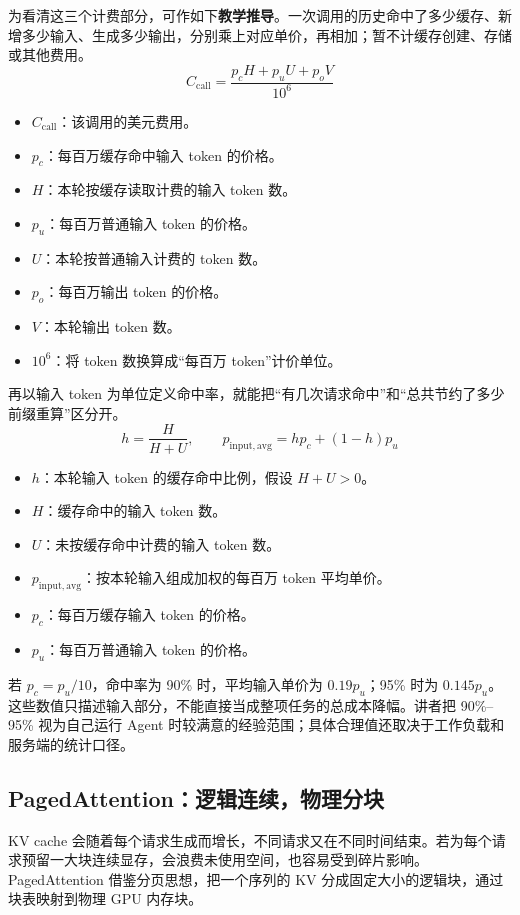 \documentclass[11pt,a4paper]{article}
\begin{document}
为看清这三个计费部分，可作如下\textbf{教学推导}。一次调用的历史命中了多少缓存、新增多少输入、生成多少输出，分别乘上对应单价，再相加；暂不计缓存创建、存储或其他费用。
$$
C_{\mathrm{call}}=\frac{p_c H+p_u U+p_o V}{10^6}
$$
\begin{itemize}
\item $C_{\mathrm{call}}$：该调用的美元费用。
\item $p_c$：每百万缓存命中输入 token 的价格。
\item $H$：本轮按缓存读取计费的输入 token 数。
\item $p_u$：每百万普通输入 token 的价格。
\item $U$：本轮按普通输入计费的 token 数。
\item $p_o$：每百万输出 token 的价格。
\item $V$：本轮输出 token 数。
\item $10^6$：将 token 数换算成“每百万 token”计价单位。
\end{itemize}

再以输入 token 为单位定义命中率，就能把“有几次请求命中”和“总共节约了多少前缀重算”区分开。
$$
h=\frac{H}{H+U},\qquad
p_{\mathrm{input,avg}}=h p_c+(1-h)p_u
$$
\begin{itemize}
\item $h$：本轮输入 token 的缓存命中比例，假设 $H+U>0$。
\item $H$：缓存命中的输入 token 数。
\item $U$：未按缓存命中计费的输入 token 数。
\item $p_{\mathrm{input,avg}}$：按本轮输入组成加权的每百万 token 平均单价。
\item $p_c$：每百万缓存输入 token 的价格。
\item $p_u$：每百万普通输入 token 的价格。
\end{itemize}

若 $p_c=p_u/10$，命中率为 90\% 时，平均输入单价为 $0.19p_u$；95\% 时为 $0.145p_u$。这些数值只描述输入部分，不能直接当成整项任务的总成本降幅。讲者把 90\%--95\% 视为自己运行 Agent 时较满意的经验范围；具体合理值还取决于工作负载和服务端的统计口径。

\subsection{PagedAttention：逻辑连续，物理分块}

KV cache 会随着每个请求生成而增长，不同请求又在不同时间结束。若为每个请求预留一大块连续显存，会浪费未使用空间，也容易受到碎片影响。PagedAttention 借鉴分页思想，把一个序列的 KV 分成固定大小的逻辑块，通过块表映射到物理 GPU 内存块。
\end{document}
